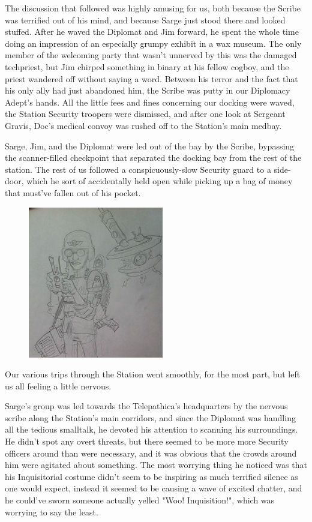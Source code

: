 The discussion that followed was highly amusing for us, both because the Scribe was terrified out of his mind, and because Sarge just stood there and looked stuffed. 
After he waved the Diplomat and Jim forward, he spent the whole time doing an impression of an especially grumpy exhibit in a wax museum. 
The only member of the welcoming party that wasn't unnerved by this was the damaged techpriest, but Jim chirped something in binary at his fellow cogboy, and the priest wandered off without saying a word. 
Between his terror and the fact that his only ally had just abandoned him, the Scribe was putty in our Diplomacy Adept's hands. 
All the little fees and fines concerning our docking were waved, the Station Security troopers were dismissed, and after one look at Sergeant Gravis, Doc's medical convoy was rushed off to the Station's main medbay.

Sarge, Jim, and the Diplomat were led out of the bay by the Scribe, bypassing the scanner-filled checkpoint that separated the docking bay from the rest of the station. 
The rest of us followed a conspicuously-slow Security guard to a side-door, which he sort of accidentally held open while picking up a bag of money that must've fallen out of his pocket.

\begin{figure}
	\begin{center}
		\includegraphics[width=\figwidth]{pics/14/9.png}
	\end{center}
\end{figure}
Our various trips through the Station went smoothly, for the most part, but left us all feeling a little nervous.

Sarge's group was led towards the Telepathica's headquarters by the nervous scribe along the Station's main corridors, and since the Diplomat was handling all the tedious smalltalk, he devoted his attention to scanning his surroundings. 
He didn't spot any overt threats, but there seemed to be more more Security officers around than were necessary, and it was obvious that the crowds around him were agitated about something. 
The most worrying thing he noticed was that his Inquisitorial costume didn't seem to be inspiring as much terrified silence as one would expect, instead it seemed to be causing a wave of excited chatter, and he could've sworn someone actually yelled "Woo! 
Inquisition!", which was worrying to say the least.

